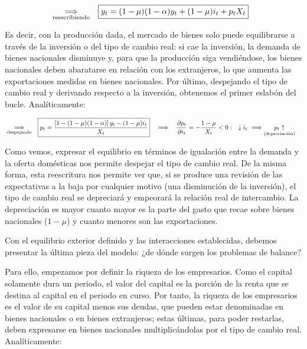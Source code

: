 \documentclass[10pt,a4paper]{article}
\begin{document}
$$\begin{aligned}
  &\underset{\text{\scriptsize reescribiendo}}{\Longrightarrow}&&\boxed{y_t=(1-\mu)(1-\alpha)y_t+(1-\mu)i_t+p_tX_t}
\end{aligned}$$

Es decir, con la producción dada, el mercado de bienes solo puede equilibrarse a través de la inversión o del tipo de cambio real: si cae la inversión, la demanda de bienes nacionales disminuye y, para que la producción siga vendiéndose, los bienes nacionales deben abaratarse en relación con los extranjeros, lo que aumenta las exportaciones medidas en bienes nacionales. Por último, despejando el tipo de cambio real y derivando respecto a la inversión, obtenemos el primer eslabón del bucle. Analíticamente:

$$\begin{aligned}
  &\underset{\text{\scriptsize despejando}}{\Longrightarrow}&& \boxed{p_t=\frac{\left[1-(1-\mu)(1-\alpha)\right]y_t-(1-\mu)i_t}{X_t}}&&\Longrightarrow\quad \frac{\partial p_t}{\partial i_t}=-\frac{1-\mu}{X_t}<0:\quad  \downarrow i_t\,\,\Longrightarrow\,\,\underset{\text{\scriptsize (depreciación)}}{p_t\uparrow}
\end{aligned}$$

Como vemos, expresar el equilibrio en términos de igualación entre la demanda y la oferta domésticas nos permite despejar el tipo de cambio real. De la misma forma, esta reescritura nos permite ver que, si se produce una revisión de las expectativas a la baja por cualquier motivo (una disminución de la inversión), el tipo de cambio real se depreciará y empeorará la relación real de intercambio. La depreciación es mayor cuanto mayor es la parte del gasto que recae sobre bienes nacionales ($1-\mu$) y cuanto menores son las exportaciones.

Con el equilibrio exterior definido y las interacciones establecidas, debemos presentar la última pieza del modelo: ¿de dónde surgen los problemas de balance?

Para ello, empezamos por definir la riqueza de los empresarios. Como el capital solamente dura un periodo, el valor del capital es la porción de la renta que se destina al capital en el periodo en curso. Por tanto, la riqueza de los empresarios es el valor de su capital menos sus deudas, que pueden estar denominadas en bienes nacionales o en bienes extranjeros; estas últimas, para poder restarlas, deben expresarse en bienes nacionales multiplicándolas por el tipo de cambio real. Analíticamente:
\end{document}
